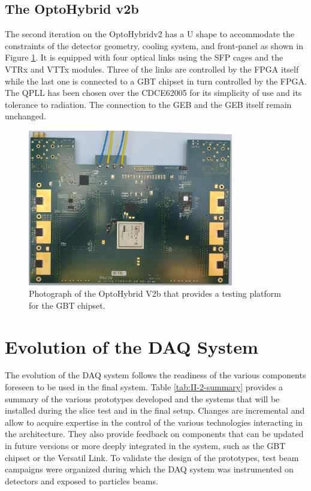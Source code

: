     \subsection{The OptoHybrid v2b}

      The second iteration on the OptoHybridv2 has a U shape to accommodate the constraints of the detector geometry, cooling system, and front-panel as shown in Figure \ref{fig:II-2-ohv2b}. It is equipped with four optical links using the SFP cages and the VTRx and VTTx modules. Three of the links are controlled by the FPGA itself while the last one is connected to a GBT chipset in turn controlled by the FPGA. The QPLL has been chosen over the CDCE62005 for its simplicity of use and its tolerance to radiation. The connection to the GEB and the GEB itself remain unchanged.

      \begin{figure}[h!]
        \centering
        \includegraphics[width=0.8\textwidth]{img/II-2-daq/oh-v2b.jpg}
        \caption{Photograph of the OptoHybrid V2b that provides a testing platform for the GBT chipset.}
        \label{fig:II-2-ohv2b}
      \end{figure}

  \section{Evolution of the DAQ System}

    The evolution of the DAQ system follows the readiness of the various components foreseen to be used in the final system. Table \ref{tab:II-2-summary} provides a summary of the various prototypes developed and the systems that will be installed during the slice test and in the final setup. Changes are incremental and allow to acquire expertise in the control of the various technologies interacting in the architecture. They also provide feedback on components that can be updated in future versions or more deeply integrated in the system, such as the GBT chipset or the Versatil Link. To validate the design of the prototypes, test beam campaigns were organized during which the DAQ system was instrumented on detectors and exposed to particles beams.


